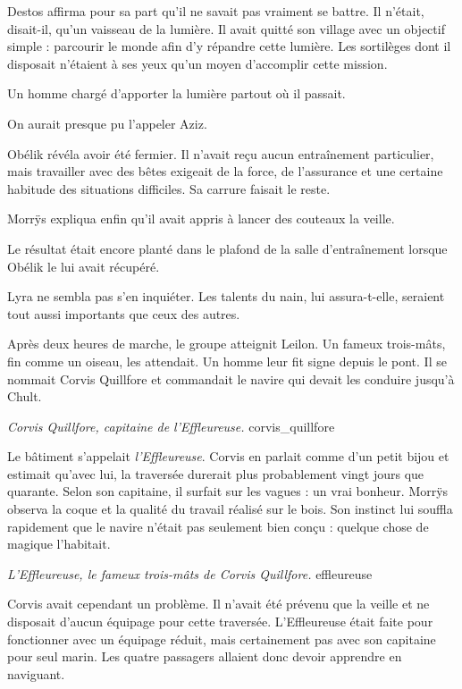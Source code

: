 Destos affirma pour sa part qu'il ne savait pas vraiment se battre. Il n'était, disait-il, qu'un vaisseau de la lumière. Il avait quitté son village avec un objectif simple : parcourir le monde afin d'y répandre cette lumière. Les sortilèges dont il disposait n'étaient à ses yeux qu'un moyen d'accomplir cette mission.

\begin{narrateur}
Un homme chargé d'apporter la lumière partout où il passait.

On aurait presque pu l'appeler Aziz.
\end{narrateur}

Obélik révéla avoir été fermier. Il n'avait reçu aucun entraînement particulier, mais travailler avec des bêtes exigeait de la force, de l'assurance et une certaine habitude des situations difficiles. Sa carrure faisait le reste.

Morrÿs expliqua enfin qu'il avait appris à lancer des couteaux la veille.

Le résultat était encore planté dans le plafond de la salle d'entraînement lorsque Obélik le lui avait récupéré.

Lyra ne sembla pas s'en inquiéter. Les talents du nain, lui assura-t-elle, seraient tout aussi importants que ceux des autres.

\scenebreak

Après deux heures de marche, le groupe atteignit Leilon. Un fameux trois-mâts, fin comme un oiseau, les attendait. Un homme leur fit signe depuis le pont. Il se nommait Corvis Quillfore et commandait le navire qui devait les conduire jusqu'à Chult.

{\textit{Corvis Quillfore, capitaine de l'Effleureuse.}}
{corvis_quillfore}

Le bâtiment s'appelait \textit{l'Effleureuse}. Corvis en parlait comme d'un petit bijou et estimait qu'avec lui, la traversée durerait plus probablement vingt jours que quarante. Selon son capitaine, il surfait sur les vagues : un vrai bonheur. Morrÿs observa la coque et la qualité du travail réalisé sur le bois. Son instinct lui souffla rapidement que le navire n'était pas seulement bien conçu : quelque chose de magique l'habitait.

{\textit{L'Effleureuse, le fameux trois-mâts de Corvis Quillfore.}}
{effleureuse}

Corvis avait cependant un problème. Il n'avait été prévenu que la veille et ne disposait d'aucun équipage pour cette traversée. L'Effleureuse était faite pour fonctionner avec un équipage réduit, mais certainement pas avec son capitaine pour seul marin. Les quatre passagers allaient donc devoir apprendre en naviguant.

